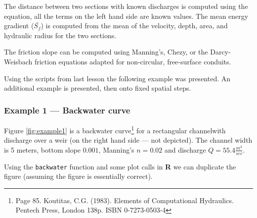 The distance between two sections with known discharges is computed using the equation, all the terms on the left hand side are known values.  The mean energy gradient ($\bar{S_f}$) is computed from the mean of the velocity, depth, area, and hydraulic radius for the two sections.

The friction slope can be computed using Manning's, Chezy, or the Darcy-Weisbach friction equations adapted for non-circular, free-surface conduits.

Using the scripts from last lesson the following example was presented. An additional example is presented, then onto fixed spatial steps.

\subsubsection{Example 1 --- Backwater curve}

Figure \ref{fig:example1} is a backwater curve\footnote{Page 85.  
   Koutitas, C.G. (1983). Elements of Computational Hydraulics. Pentech Press, London 138p. ISBN 0-7273-0503-4 } for a rectangular channelwith discharge over a weir (on the right hand side --- not depicted).  The channel width is 5 meters, bottom slope $0.001$, Manning's $n=0.02$ and discharge $Q=55.4 \frac{m^3}{sec}$.

Using the \texttt{backwater} function and some plot calls in \textbf{R} we can duplicate the figure (assuming the figure is essentially correct).

